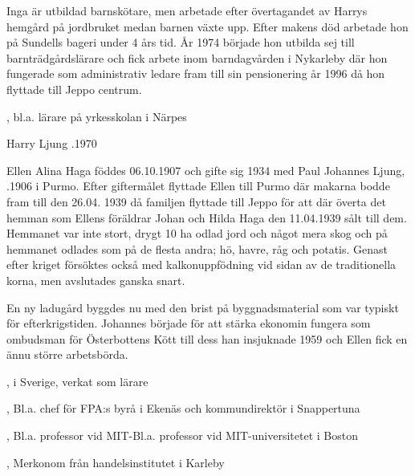 Inga är utbildad barnskötare, men arbetade efter övertagandet av Harrys hemgård på jordbruket medan barnen växte upp. Efter makens död arbetade hon på Sundells bageri under 4 års tid. År 1974 började hon utbilda sej till barnträdgårdslärare och fick arbete inom barndagvården i Nykarleby där hon fungerade som administrativ ledare fram till sin pensionering år 1996 då hon flyttade till Jeppo centrum.

\begin{jhchildren}
  \item {}
  \item {}, bl.a. lärare på yrkesskolan i Närpes
  \item {}
\end{jhchildren}

Harry Ljung .1970



Ellen Alina Haga föddes 06.10.1907 och gifte sig  1934 med Paul Johannes Ljung, .1906 i Purmo. Efter giftermålet flyttade Ellen till Purmo där makarna bodde fram till den 26.04. 1939 då familjen flyttade till Jeppo för att där överta det hemman som Ellens föräldrar Johan och Hilda Haga den 11.04.1939 sålt till dem. Hemmanet var inte stort, drygt 10 ha odlad jord och något mera skog och på hemmanet odlades som på de flesta andra; hö, havre, råg och potatis. Genast efter kriget försöktes också med kalkonuppfödning vid sidan av de traditionella korna, men avslutades ganska snart.

En ny ladugård byggdes nu med den brist på byggnadsmaterial som var typiskt för efterkrigstiden. Johannes började för att stärka ekonomin fungera som ombudsman för Österbottens Kött till dess han insjuknade 1959 och Ellen fick en ännu större arbetsbörda.

\begin{jhchildren}
  \item {}
  \item {}, i Sverige, verkat som lärare
  \item {}, Bl.a. chef för FPA:s byrå i Ekenäs och kommundirektör i Snappertuna
  \item {}, Bl.a. professor vid MIT-Bl.a. professor vid MIT-universitetet i Boston
  \item {}, Merkonom från handelsinstitutet i Karleby
\end{jhchildren}

